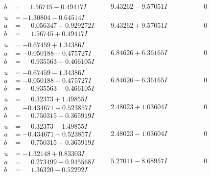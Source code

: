 \documentclass[1p]{elsarticle_modified}
\theoremstyle{definition}
\begin{document}
$$\begin{array}{c|c|c}
\begin{aligned}
b &= \phantom{-}1.56745 - 0.49417 I\end{aligned}
 & \phantom{-}9.43262 - 9.57051 I & \phantom{-0.000000 } 0 \\ \hline\begin{aligned}
u &= -1.30804 - 0.64514 I \\
a &= \phantom{-}0.056347 + 0.929272 I \\
b &= \phantom{-}1.56745 + 0.49417 I\end{aligned}
 & \phantom{-}9.43262 + 9.57051 I & \phantom{-0.000000 } 0 \\ \hline\begin{aligned}
u &= -0.67459 + 1.34386 I \\
a &= -0.050188 + 0.475727 I \\
b &= \phantom{-}0.935563 + 0.466105 I\end{aligned}
 & \phantom{-}6.84626 + 6.36165 I & \phantom{-0.000000 } 0 \\ \hline\begin{aligned}
u &= -0.67459 - 1.34386 I \\
a &= -0.050188 - 0.475727 I \\
b &= \phantom{-}0.935563 - 0.466105 I\end{aligned}
 & \phantom{-}6.84626 - 6.36165 I & \phantom{-0.000000 } 0 \\ \hline\begin{aligned}
u &= \phantom{-}0.32373 + 1.49855 I \\
a &= -0.434671 - 0.523857 I \\
b &= \phantom{-}0.750315 - 0.365919 I\end{aligned}
 & \phantom{-}2.48023 + 1.03604 I & \phantom{-0.000000 } 0 \\ \hline\begin{aligned}
u &= \phantom{-}0.32373 - 1.49855 I \\
a &= -0.434671 + 0.523857 I \\
b &= \phantom{-}0.750315 + 0.365919 I\end{aligned}
 & \phantom{-}2.48023 - 1.03604 I & \phantom{-0.000000 } 0 \\ \hline\begin{aligned}
u &= -1.32148 + 0.83303 I \\
a &= \phantom{-}0.273499 - 0.945568 I \\
b &= \phantom{-}1.36320 - 0.52292 I\end{aligned}
 & \phantom{-}5.27011 - 8.68957 I & \phantom{-0.000000 } 0 \\ \hline\begin{aligned}

\end{aligned}
\end{array}$$
\end{document}
